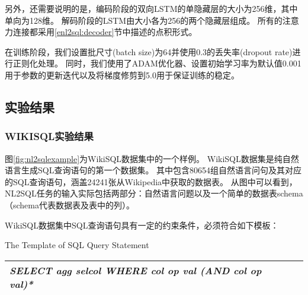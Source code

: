 另外，还需要说明的是，编码阶段的双向LSTM的单隐藏层的大小为256维，其中单向为128维。
解码阶段的LSTM由大小各为256的两个隐藏层组成。
所有的注意力连接都采用\ref{enl2sql:decoder}节中描述的点积形式。

在训练阶段，我们设置批尺寸(batch size)为64并使用0.3的丢失率(dropout rate)进行正则化处理。
同时，我们使用了ADAM优化器\cite{kingma2014adam}、设置初始学习率为默认值0.001用于参数的更新迭代以及将梯度修剪到5.0用于保证训练的稳定。


\subsection{实验结果}
\subsubsection{WIKISQL实验结果}

图\ref{fig:nl2sqlexample}为WikiSQL数据集\cite{zhong2017seq2sql}中的一个样例。
WikiSQL数据集是纯自然语言生成SQL查询语句的第一个数据集。
其中包含80654组自然语言问句及其对应的SQL查询语句，涵盖24241张从Wikipedia中获取的数据表。
从图中可以看到，NL2SQL任务的输入实际包括两部分：自然语言问题以及一个简单的数据表schema（schema代表数据表及表中的列）。

WikiSQL数据集中SQL查询语句具有一定的约束条件，必须符合如下模板：

\begin{table}[!hpb]
    \centering
      {The Template of SQL Query Statement}
    \label{nli:sqlmb}
    \begin{tabular}{@{}llr@{}} \toprule
    \emph{SELECT   agg   selcol   WHERE   col   op   val   (AND   col   op   val)*}\\\bottomrule
  
    \end{tabular}
  \end{table}

